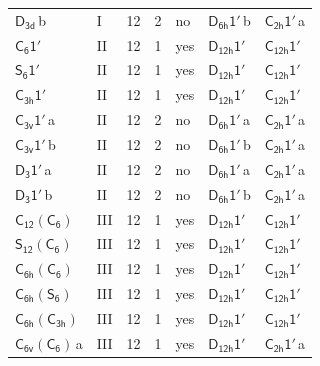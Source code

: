 \documentclass[10pt,a4paper]{article}
\numberwithin{equation}{section}
\newcommand{\grp}[1]{\mathsf{#1}}
\newcommand{\clsletter}[1]{\,{\scriptsize\color{black!55}#1}}
\begin{document}
{\begin{longtable}{@{}llrrlll@{}}
\href{../../../rotation/data/pdf/D3d.pdf}{$\grp{D_{3d}}$}\clsletter{b} & I & 12 & 2 & no & \href{D6h-1p.pdf}{$\grp{D_{6h}1'}$}\clsletter{b} & \href{C2h-1p.pdf}{$\grp{C_{2h}1'}$}\clsletter{a}\\
\href{C6-1p.pdf}{$\grp{C_{6}1'}$} & II & 12 & 1 & yes & \href{D12h-1p.pdf}{$\grp{D_{12h}1'}$} & \href{C12h-1p.pdf}{$\grp{C_{12h}1'}$}\\
\href{S6-1p.pdf}{$\grp{S_{6}1'}$} & II & 12 & 1 & yes & \href{D12h-1p.pdf}{$\grp{D_{12h}1'}$} & \href{C12h-1p.pdf}{$\grp{C_{12h}1'}$}\\
\href{C3h-1p.pdf}{$\grp{C_{3h}1'}$} & II & 12 & 1 & yes & \href{D12h-1p.pdf}{$\grp{D_{12h}1'}$} & \href{C12h-1p.pdf}{$\grp{C_{12h}1'}$}\\
\href{C3v-1p.pdf}{$\grp{C_{3v}1'}$}\clsletter{a} & II & 12 & 2 & no & \href{D6h-1p.pdf}{$\grp{D_{6h}1'}$}\clsletter{a} & \href{C2h-1p.pdf}{$\grp{C_{2h}1'}$}\clsletter{a}\\
\href{C3v-1p.pdf}{$\grp{C_{3v}1'}$}\clsletter{b} & II & 12 & 2 & no & \href{D6h-1p.pdf}{$\grp{D_{6h}1'}$}\clsletter{b} & \href{C2h-1p.pdf}{$\grp{C_{2h}1'}$}\clsletter{a}\\
\href{D3-1p.pdf}{$\grp{D_{3}1'}$}\clsletter{a} & II & 12 & 2 & no & \href{D6h-1p.pdf}{$\grp{D_{6h}1'}$}\clsletter{a} & \href{C2h-1p.pdf}{$\grp{C_{2h}1'}$}\clsletter{a}\\
\href{D3-1p.pdf}{$\grp{D_{3}1'}$}\clsletter{b} & II & 12 & 2 & no & \href{D6h-1p.pdf}{$\grp{D_{6h}1'}$}\clsletter{b} & \href{C2h-1p.pdf}{$\grp{C_{2h}1'}$}\clsletter{a}\\
\href{C12-C6.pdf}{$\grp{C_{12}}(\grp{C_{6}})$} & III & 12 & 1 & yes & \href{D12h-1p.pdf}{$\grp{D_{12h}1'}$} & \href{C12h-1p.pdf}{$\grp{C_{12h}1'}$}\\
\href{S12-C6.pdf}{$\grp{S_{12}}(\grp{C_{6}})$} & III & 12 & 1 & yes & \href{D12h-1p.pdf}{$\grp{D_{12h}1'}$} & \href{C12h-1p.pdf}{$\grp{C_{12h}1'}$}\\
\href{C6h-C6.pdf}{$\grp{C_{6h}}(\grp{C_{6}})$} & III & 12 & 1 & yes & \href{D12h-1p.pdf}{$\grp{D_{12h}1'}$} & \href{C12h-1p.pdf}{$\grp{C_{12h}1'}$}\\
\href{C6h-S6.pdf}{$\grp{C_{6h}}(\grp{S_{6}})$} & III & 12 & 1 & yes & \href{D12h-1p.pdf}{$\grp{D_{12h}1'}$} & \href{C12h-1p.pdf}{$\grp{C_{12h}1'}$}\\
\href{C6h-C3h.pdf}{$\grp{C_{6h}}(\grp{C_{3h}})$} & III & 12 & 1 & yes & \href{D12h-1p.pdf}{$\grp{D_{12h}1'}$} & \href{C12h-1p.pdf}{$\grp{C_{12h}1'}$}\\
\href{C6v-C6.pdf}{$\grp{C_{6v}}(\grp{C_{6}})$}\clsletter{a} & III & 12 & 1 & yes & \href{D12h-1p.pdf}{$\grp{D_{12h}1'}$} & \href{C2h-1p.pdf}{$\grp{C_{2h}1'}$}\clsletter{a}\\

\end{longtable}}
\end{document}
